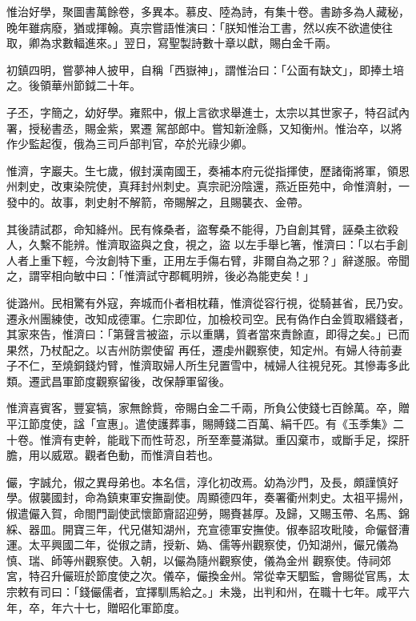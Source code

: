 \begin{pinyinscope}
 惟治好學，聚圖書萬餘卷，多異本。慕皮、陸為詩，有集十卷。書跡多為人藏秘，晚年雖病廢，猶或揮翰。真宗嘗語惟演曰：「朕知惟治工書，然以疾不欲遣使往取，卿為求數輻進來。」翌日，寫聖製詩數十章以獻，賜白金千兩。



 初鎮四明，嘗夢神人披甲，自稱「西嶽神」，謂惟治曰：「公面有缺文」，即捧土培之。後領華州節鉞二十年。



 子丕，字簡之，幼好學。雍熙中，俶上言欲求舉進士，太宗以其世家子，特召試內署，授秘書丞，賜金紫，累遷
 駕部郎中。嘗知新淦縣，又知衡州。惟治卒，以將作少監起復，俄為三司戶部判官，卒於光祿少卿。



 惟濟，字巖夫。生七歲，俶封漢南國王，奏補本府元從指揮使，歷諸衛將軍，領恩州刺史，改東染院使，真拜封州刺史。真宗祀汾陰還，燕近臣苑中，命惟濟射，一發中的。故事，刺史射不解箭，帝賜解之，且賜襲衣、金帶。



 其後請試郡，命知絳州。民有條桑者，盜奪桑不能得，乃自創其臂，誣桑主欲殺人，久繫不能辨。惟濟取盜與之食，視之，盜
 以左手舉匕箸，惟濟曰：「以右手創人者上重下輕，今汝創特下重，正用左手傷右臂，非爾自為之邪？」辭遂服。帝聞之，謂宰相向敏中曰：「惟濟試守郡輒明辨，後必為能吏矣！」



 徙潞州。民相驚有外寇，奔城而仆者相枕藉，惟濟從容行視，從騎甚省，民乃安。遷永州團練使，改知成德軍。仁宗即位，加檢校司空。民有偽作白金質取緡錢者，其家來告，惟濟曰：「第聲言被盜，示以重購，質者當來責餘直，即得之矣。」已而果然，乃杖配之。以吉州防禦使留
 再任，遷虔州觀察使，知定州。有婦人待前妻子不仁，至燒銅錢灼臂，惟濟取婦人所生兒置雪中，械婦人往視兒死。其慘毒多此類。遷武昌軍節度觀察留後，改保靜軍留後。



 惟濟喜賓客，豐宴犒，家無餘貲，帝賜白金二千兩，所負公使錢七百餘萬。卒，贈平江節度使，諡「宣惠」。遣使護葬事，賜賻錢二百萬、絹千匹。有《玉季集》二十卷。惟濟有吏幹，能戢下而性苛忍，所至牽蔓滿獄。重囚棄市，或斷手足，探肝膽，用以威眾。觀者色動，而惟濟自若也。



 儼，字誠允，俶之異母弟也。本名信，淳化初改焉。幼為沙門，及長，頗謹慎好學。俶襲國封，命為鎮東軍安撫副使。周顯德四年，奏署衢州刺史。太祖平揚州，俶遣儼入賀，命閤門副使武懷節齎詔迎勞，賜賚甚厚。及歸，又賜玉帶、名馬、錦綵、器皿。開寶三年，代兄偡知湖州，充宣德軍安撫使。俶奉詔攻毗陵，命儼督漕運。太平興國二年，從俶之請，授新、媯、儒等州觀察使，仍知湖州，儼兄儀為慎、瑞、師等州觀察使。入朝，以儼為隨州觀察使，儀為金州
 觀察使。侍祠郊宮，特召升儼班於節度使之次。儀卒，儼換金州。常從幸天駟監，會賜從官馬，太宗敕有司曰：「錢儼儒者，宜擇馴馬給之。」未幾，出判和州，在職十七年。咸平六年，卒，年六十七，贈昭化軍節度。




\end{pinyinscope}
